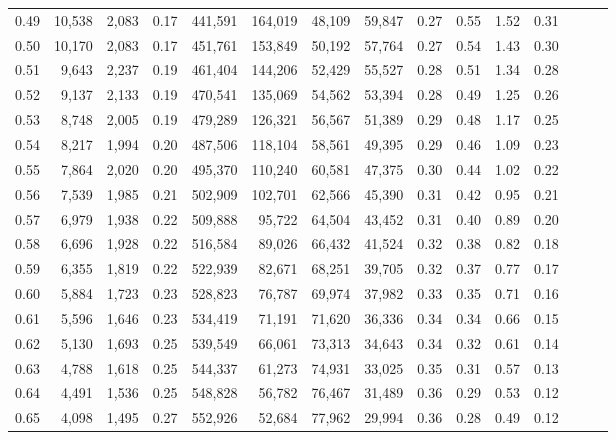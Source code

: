 \begin{tabular}{rrrrrrrrrrrrrrr}
0.49 &  10,538 &  2,083 &  0.17 &  441,591 &  164,019 &   48,109 &   59,847 &  0.27 &  0.55 &  1.52 &      0.31 \\
0.50 &  10,170 &  2,083 &  0.17 &  451,761 &  153,849 &   50,192 &   57,764 &  0.27 &  0.54 &  1.43 &      0.30 \\
0.51 &   9,643 &  2,237 &  0.19 &  461,404 &  144,206 &   52,429 &   55,527 &  0.28 &  0.51 &  1.34 &      0.28 \\
0.52 &   9,137 &  2,133 &  0.19 &  470,541 &  135,069 &   54,562 &   53,394 &  0.28 &  0.49 &  1.25 &      0.26 \\
0.53 &   8,748 &  2,005 &  0.19 &  479,289 &  126,321 &   56,567 &   51,389 &  0.29 &  0.48 &  1.17 &      0.25 \\
0.54 &   8,217 &  1,994 &  0.20 &  487,506 &  118,104 &   58,561 &   49,395 &  0.29 &  0.46 &  1.09 &      0.23 \\
0.55 &   7,864 &  2,020 &  0.20 &  495,370 &  110,240 &   60,581 &   47,375 &  0.30 &  0.44 &  1.02 &      0.22 \\
0.56 &   7,539 &  1,985 &  0.21 &  502,909 &  102,701 &   62,566 &   45,390 &  0.31 &  0.42 &  0.95 &      0.21 \\
0.57 &   6,979 &  1,938 &  0.22 &  509,888 &   95,722 &   64,504 &   43,452 &  0.31 &  0.40 &  0.89 &      0.20 \\
0.58 &   6,696 &  1,928 &  0.22 &  516,584 &   89,026 &   66,432 &   41,524 &  0.32 &  0.38 &  0.82 &      0.18 \\
0.59 &   6,355 &  1,819 &  0.22 &  522,939 &   82,671 &   68,251 &   39,705 &  0.32 &  0.37 &  0.77 &      0.17 \\
0.60 &   5,884 &  1,723 &  0.23 &  528,823 &   76,787 &   69,974 &   37,982 &  0.33 &  0.35 &  0.71 &      0.16 \\
0.61 &   5,596 &  1,646 &  0.23 &  534,419 &   71,191 &   71,620 &   36,336 &  0.34 &  0.34 &  0.66 &      0.15 \\
0.62 &   5,130 &  1,693 &  0.25 &  539,549 &   66,061 &   73,313 &   34,643 &  0.34 &  0.32 &  0.61 &      0.14 \\
0.63 &   4,788 &  1,618 &  0.25 &  544,337 &   61,273 &   74,931 &   33,025 &  0.35 &  0.31 &  0.57 &      0.13 \\
0.64 &   4,491 &  1,536 &  0.25 &  548,828 &   56,782 &   76,467 &   31,489 &  0.36 &  0.29 &  0.53 &      0.12 \\
0.65 &   4,098 &  1,495 &  0.27 &  552,926 &   52,684 &   77,962 &   29,994 &  0.36 &  0.28 &  0.49 &      0.12 \\

\end{tabular}
